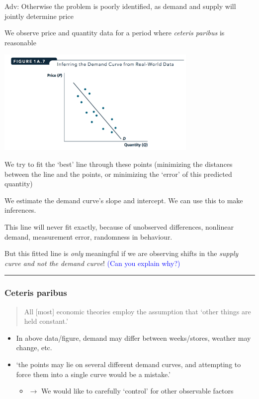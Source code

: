 \documentclass[]{article}
\providecommand{\tightlist}{%
  \setlength{\itemsep}{0pt}\setlength{\parskip}{0pt}}
\begin{document}
\textcolor{RawSienna}{Adv: Otherwise the problem is poorly identified, as demand and supply will jointly determine price}

We observe price and quantity data for a period where \emph{ceteris
paribus} is reasonable

\includegraphics[height=2in]{picsfigs/demanddata.png}

We try to fit the `best' line through these points (minimizing the
distances between the line and the points, or minimizing the `error' of
this predicted quantity)

We estimate the demand curve's slope and intercept. We can use this to
make inferences.

This line will never fit exactly, because of unobserved differences,
nonlinear demand, measurement error, randomness in behaviour.

But this fitted line is \emph{only} meaningful if we are observing
shifts in the \emph{supply curve and not the demand curve}!
\textcolor{blue}{(Can you explain why?)}

\begin{center}\rule{0.5\linewidth}{\linethickness}\end{center}

\hypertarget{ceteris-paribus}{%
\subsubsection{Ceteris paribus}\label{ceteris-paribus}}

\begin{quote}
All {[}most{]} economic theories employ the assumption that `other
things are held constant.'
\end{quote}

\begin{itemize}
\tightlist
\item
  In above data/figure, demand may differ between weeks/stores, weather
  may change, etc.
\item
  `the points may lie on several different demand curves, and attempting
  to force them into a single curve would be a mistake.'

  \begin{itemize}
  \tightlist
  \item
    \(\rightarrow\) We would like to carefully `control' for other
    observable factors
  \end{itemize}
\end{itemize}
\end{document}
